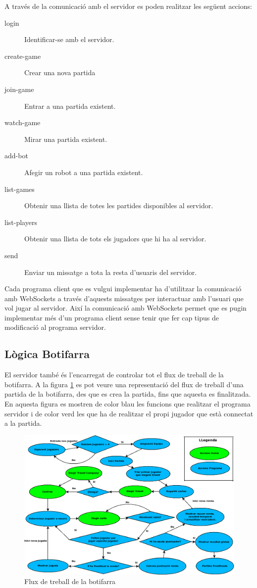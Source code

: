 A través de la comunicació amb el servidor es poden realitzar les següent accions: 

\begin{description}
\item[login] {Identificar-se amb el servidor.}
\item[create-game] {Crear una nova partida}
\item[join-game] {Entrar a una partida existent.}
\item[watch-game] {Mirar una partida existent.}
\item[add-bot] {Afegir un robot a una partida existent.}
\item[list-games] {Obtenir una llista de totes les partides disponibles al servidor.}
\item[list-players] {Obtenir una llista de tots els jugadors que hi ha al servidor.}
\item[send] {Enviar un missatge a tota la resta d'usuaris del servidor. }
\end{description}

Cada programa client que es vulgui implementar ha d'utilitzar la comunicació amb WebSockets a través d'aquests missatges per interactuar amb l'usuari que vol jugar al servidor. Així la comunicació amb WebSockets permet que es pugin implementar més d'un programa client sense tenir que fer cap tipus de modificació al programa servidor. 

\subsection{Lògica Botifarra}

El servidor també és l'encarregat de controlar tot el flux de treball de la botifarra. A la figura \ref{fig:buti-workflow} es pot veure una representació del flux de treball d'una partida de la botifarra, des que es crea la partida, fins que aquesta es finalitzada. En aquesta figura es mostren de color blau les funcions que realitzar el programa servidor i de color verd les que ha de realitzar el propi jugador que està connectat a la partida. 

\begin{figure}[htbp]
\hspace*{-1in}
\centering\includegraphics[width=18cm]{img/butifarra_workflow.png}
\caption{Flux de treball de la botifarra}
\label{fig:buti-workflow}
\end{figure} 

